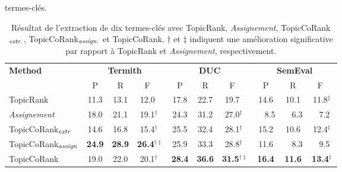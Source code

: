         termes-clés.
        \begin{table}[h!]
          \centering
            \begin{tabular}{l|ccc@{}|ccc@{}|ccc@{~}}
              \toprule
              \multirow{2}{*}{\textbf{Method}} &
         \multicolumn{3}{c|}{\textbf{Termith}} & \multicolumn{3}{c|}{\textbf{DUC}} & \multicolumn{3}{c}{\textbf{SemEval}}\\
              \cline{2-10}
              & P & R & F$^{~~~~}$ & P & R & F$^{~~~~}$ & P & R & F$^{~~}$\\
              \hline
              TopicRank & 11.3 & 13.1 & 12.0$^{~~~~}$ & 17.8 & 22.7 & 19.7$^{~~~~}$ & 14.6 & 10.1 & 11.8$^{\ddagger}$\\
              \textit{Assignement} & 18.0 & 21.1 & 19.1$^{\dagger~~}$ & 24.3 & 31.2 & 27.0$^{\dagger~~}$ & ~~8.5 & ~~6.3 & ~~7.2$^{~~}$\\
              \hline
              TopicCoRank$_\textnormal{\textit{extr}}$ & 14.6 & 16.8 & 15.4$^{\dagger~~}$ & 25.5 & 32.4 & 28.1$^{\dagger~~}$ & 15.2 & 10.6 & 12.4$^{\ddagger}$\\
              TopicCoRank$_\textnormal{\textit{assign}}$ & \textbf{24.9} & \textbf{28.9} & \textbf{26.4$^{\dagger\ddagger}$} & 25.9 & 33.3 & 28.8$^{\dagger~~}$ & 11.6 & ~~8.3 & ~~9.5$^{~~}$\\
              \hline
              TopicCoRank & 19.0 & 22.0 & 20.1$^{\dagger~~}$ & \textbf{28.4} & \textbf{36.6} & \textbf{31.5$^{\dagger\ddagger}$} & \textbf{16.4} & \textbf{11.6} & \textbf{13.4$^{\ddagger}$}\\
              \bottomrule
            \end{tabular}
        \caption[
          Résultat de l'extraction de dix termes-clés avec TopicRank,
          \textit{Assignement}, TopicCoRank$_\textnormal{\textit{extr.}}$,
          TopicCoRank$_\textnormal{\textit{assign.}}$ et TopicCoRank
        ]{
          Résultat de l'extraction de dix termes-clés avec TopicRank,
          \textit{Assignement}, TopicCoRank$_\textnormal{\textit{extr.}}$,
          TopicCoRank$_\textnormal{\textit{assign.}}$ et TopicCoRank. $\dagger$
          et $\ddagger$ indiquent une amélioration significative par rapport à
          TopicRank et \textit{Assignement}, respectivement.
          \label{tab:topiccorank-comparison_results}}
        \end{table}
        
